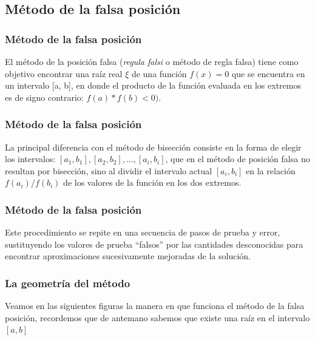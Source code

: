 \subsection{Método de la falsa posición}
\begin{frame}
\frametitle{Método de la falsa posición}
El método de la posición falsa (\emph{regula falsi} o método de regla falsa) tiene como objetivo encontrar una raíz real $\xi$ de una función $f (x) = 0$ que se encuentra en un intervalo [a, b], en donde el producto de la función evaluada en los extremos es de signo contrario: $f(a) * f(b) < 0)$.
\end{frame}
\begin{frame}
\frametitle{Método de la falsa posición}
La principal diferencia con el método de bisección consiste en la forma de elegir los intervalos: $[a_{1}, b_{1}], [a_{2}, b_{2}], \ldots , [a_{i}, b_{i}]$, que en el método de posición falsa no resultan por bisección, sino al dividir el intervalo actual $[a_{i}, b_{i}]$ en la relación $f(a_{i}) / f(b_{i})$ de los valores de la función en los dos extremos.
\end{frame}
\begin{frame}
\frametitle{Método de la falsa posición}
Este procedimiento se repite en una secuencia de pasos de prueba y error, sustituyendo los valores de prueba \enquote{falsos} por las cantidades desconocidas para encontrar aproximaciones sucesivamente mejoradas de la solución.
\end{frame}
\begin{frame}
\frametitle{La geometría del método}
Veamos en las siguientes figuras la manera en que funciona el método de la falsa posición, recordemos que de antemano sabemos que existe una raíz en el intervalo $[a, b]$
\end{frame}
